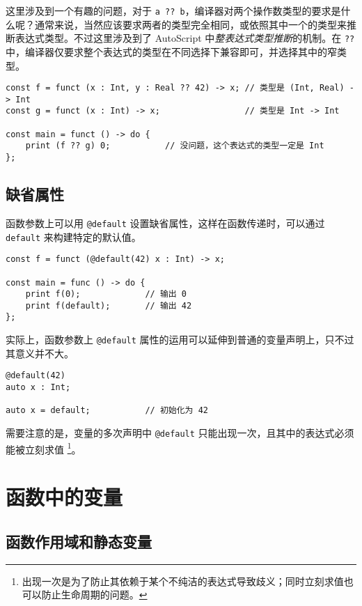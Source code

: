 这里涉及到一个有趣的问题，对于 \lstinline!a ?? b!，编译器对两个操作数类型的要求是什么呢？通常来说，当然应该要求两者的类型完全相同，或依照其中一个的类型来推断表达式类型。不过这里涉及到了 AutoScript 中\emph{整表达式类型推断}的机制。在 \lstinline!??! 中，编译器仅要求整个表达式的类型在不同选择下兼容即可，并选择其中的窄类型。

\begin{lstlisting}
const f = funct (x : Int, y : Real ?? 42) -> x;	// 类型是 (Int, Real) -> Int
const g = funct (x : Int) -> x;					// 类型是 Int -> Int

const main = funct () -> do {
	print (f ?? g) 0;			// 没问题，这个表达式的类型一定是 Int
};
\end{lstlisting}


\subsection{缺省属性}

函数参数上可以用 \lstinline!@default! 设置缺省属性，这样在函数传递时，可以通过 \lstinline!default! 来构建特定的默认值。

\begin{minipage}[c]{0.95\textwidth}
\vspace{1.0em}
\begin{lstlisting}
const f = funct (@default(42) x : Int) -> x;

const main = func () -> do {
    print f(0);				// 输出 0
    print f(default);		// 输出 42
};
\end{lstlisting}
\end{minipage}

实际上，函数参数上 \lstinline!@default! 属性的运用可以延伸到普通的变量声明上，只不过其意义并不大。

\begin{lstlisting}
@default(42)
auto x : Int;

auto x = default;			// 初始化为 42
\end{lstlisting}

需要注意的是，变量的多次声明中 \lstinline!@default! 只能出现一次，且其中的表达式必须能被立刻求值 \footnote{出现一次是为了防止其依赖于某个不纯洁的表达式导致歧义；同时立刻求值也可以防止生命周期的问题。}。

\section{函数中的变量}

\subsection{函数作用域和静态变量}


